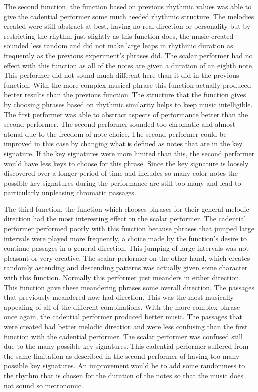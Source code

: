 \documentclass[12pt]{ucthesis}
\begin{document}
The second function, the function based on previous rhythmic values was able to give the cadential performer some much needed rhythmic structure. The melodies created were still abstract at best, having no real direction or personality but by restricting the rhythm just slightly as this function does, the music created sounded less random and did not make large leaps in rhythmic duration as frequently as the previous experiment's phrases did. The scalar performer had no effect with this function as all of the notes are given a duration of an eighth note. This performer did not sound much different here than it did in the previous function. With the more complex musical phrase this function actually produced better results than the previous function. The structure that the function gives by choosing phrases based on rhythmic similarity helps to keep music intelligible. The first performer was able to abstract aspects of performance better than the second performer. The second performer sounded too chromatic and almost atonal due to the freedom of note choice. The second performer could be improved in this case by changing what is defined as notes that are in the key signature. If the key signatures were more limited than this, the second performer would have less keys to choose for this phrase. Since the key signature is loosely discovered over a longer period of time and includes so many color notes the possible key signatures during the performance are still too many and lead to particularly unpleasing chromatic passages.

The third function, the function which chooses phrases for their general melodic direction had the most interesting effect on the scalar performer. The cadential performer performed poorly with this function because phrases that jumped large intervals were played more frequently, a choice made by the function's desire to continue passages in a general direction. This jumping of large intervals was not pleasant or very creative. The scalar performer on the other hand, which creates randomly ascending and descending patterns was actually given some character with this function. Normally this performer just meanders in either direction. This function gave these meandering phrases some overall direction. The passages that previously meandered now had direction. This was the most musically appealing of all of the different combinations. With the more complex phrase once again, the cadential performer produced better music. The passages that were created had better melodic direction and were less confusing than the first function with the cadential performer. The scalar performer was confused still due to the many possible key signatures. This cadential performer suffered from the same limitation as described in the second performer of having too many possible key signatures.  An improvement would be to add some randomness to the rhythm that is chosen for the duration of the notes so that the music does not sound so metronomic. 
\end{document}
